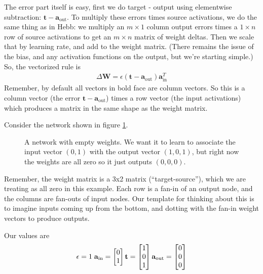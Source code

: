 The error part itself is easy, first we do target - output using elementwise subtraction: $\mathbf{t} - \mathbf{a}_{\text{out}}$. To multiply these errors times source activations, we do the same thing as in Hebb: we multiply an $m \times  1$ column output errors times a $1 \times  n$ row of source activations to get an $m \times n$ matrix of weight deltas. Then we scale that by learning rate, and add to the weight matrix. (There remains the issue of the bias, and any activation functions on the output, but we're starting simple.) So, the vectorized rule is
\begin{eqnarray}\label{vectorizedLMS}
\Delta \mathbf{W}  =  \epsilon (\mathbf{t} - \mathbf{a}_{\text{out}}) \mathbf{a}_{\text{in}}^T
\end{eqnarray}
Remember, by default all vectors in bold face are column vectors. So this is a column vector (the error $\mathbf{t} - \mathbf{a}_{\text{out}}$) times a row vector (the input activations) which produces a matrix in the same shape as the weight matrix.

Consider the network shown in figure \ref{lms_vector_pre}.

\begin{figure}[h]
\centering
{}
\caption[Jeff Yoshimi.]{A network with empty weights. We want it to learn to associate the input vector $(0,1)$ with the output vector $(1,0,1)$, but right now the weights are all zero so it just outputs $(0,0,0)$. }
\label{lms_vector_pre}
\end{figure}

Remember, the weight matrix is a 3x2 matrix  (``target-source''), which we are treating as all zero in this example. Each row is a fan-in of an output node, and the columns are fan-outs of input nodes. Our template for thinking about this is to imagine inputs coming up from the bottom, and dotting with the fan-in weight vectors to produce outputs.

Our values are
\begin{equation*}
\epsilon = 1 \; \; \\
\mathbf{a}_{\text{in}} = \begin{bmatrix} 0 \\ 1 \end{bmatrix} \\
\mathbf{t} = \begin{bmatrix} 1 \\ 0 \\ 1 \end{bmatrix} \\
\mathbf{a}_{\text{out}} = \begin{bmatrix} 0 \\ 0 \\ 0 \end{bmatrix}
\end{equation*}

